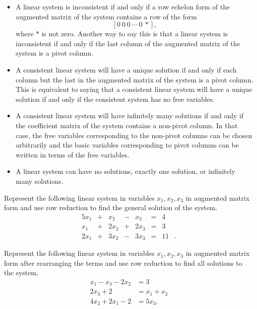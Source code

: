 \begin{itemize}
	\begin{itemize}
	\item A linear system is inconsistent if and only if a row echelon form of the augmented matrix of the system contains a row of the form
    \[[0 \ 0 \ 0 \ \cdots \ 0 \ *],\]
    where $*$ is not zero. Another way to say this is that a linear system is inconsistent if and only if the last column of the augmented matrix of the system is a pivot column.
	\item A consistent linear system will have a unique solution if and only if each column but the last in the augmented matrix of the system is a pivot column. This is equivalent to saying that a consistent linear system will have a unique solution if and only if the consistent system has no free variables.
	\item A consistent linear system will have infinitely many solutions if and only if the coefficient matrix of the system contains a non-pivot column. In that case, the free variables corresponding to the non-pivot columns can be chosen arbitrarily and the basic variables corresponding to pivot columns can be written in terms of the free variables.
	\item A linear system can have no solutions, exactly one solution, or infinitely many solutions.
	\end{itemize}  
\end{itemize}




\label{sec:row_ech_exer}
\be
\item Represent the following linear system in variables $x_1, x_2, x_3$ in augmented matrix form and use row reduction to find the general solution of the system.
\begin{alignat*}{5}
{}x_1 	&{}+{}	&{}x_2	&{}-{}	&{}x_3 	&= &{}4&{} \\
{}x_1	&{}+{}	&{2}x_2 &{}+{}	&{2}x_3 &= &{}3&{}\\
{2}x_1	&{}+{}	&{3}x_2 &{}-{}	&{3}x_3 &= &{}11&{.}
\end{alignat*}

\item Represent the following linear system in variables $x_1, x_2, x_3$ in augmented matrix form after rearranging the terms and use row reduction to find all solutions to the system. %
\begin{align*}
x_1 - x_3 - 2x_2 &= 3 \\
2x_3 + 2 &= x_1 +x_2\\
4x_2 + 2x_1 - 2 &= 5x_3.
\end{align*}

